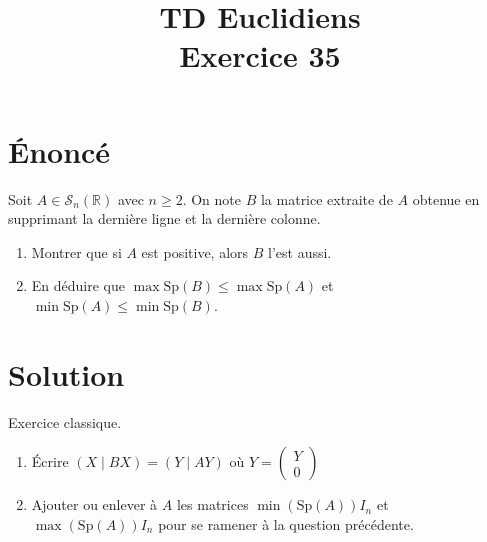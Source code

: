 \documentclass[french]{article}
\title{TD Euclidiens\\ Exercice 35}
\date{}
\newcommand{\R}{\mathbb{R}}
\begin{document}
\maketitle

\section{Énoncé}
Soit $A\in\mathcal{S}_n(\R)$ avec $n\geqslant 2$. On note $B$ la matrice extraite de $A$ obtenue en supprimant la dernière ligne et la dernière colonne.
\begin{enumerate}
	\item Montrer que si $A$ est positive, alors $B$ l'est aussi.
	\item En déduire que $\max\text{Sp}(B)\leqslant \max\text{Sp}(A)$ et $\min\text{Sp}(A)\leqslant\min\text{Sp}(B)$.
\end{enumerate}
\section{Solution}
Exercice classique.
\begin{enumerate}
	\item Écrire $(X\mid BX)=(Y\mid AY)$ où $Y=\begin{pmatrix}
		Y\\
		0
	\end{pmatrix}$
	\item Ajouter ou enlever à $A$ les matrices $\min(\text{Sp}(A))I_n$ et $\max(\text{Sp}(A))I_n$ pour se ramener à la question précédente.
\end{enumerate}
\end{document}
